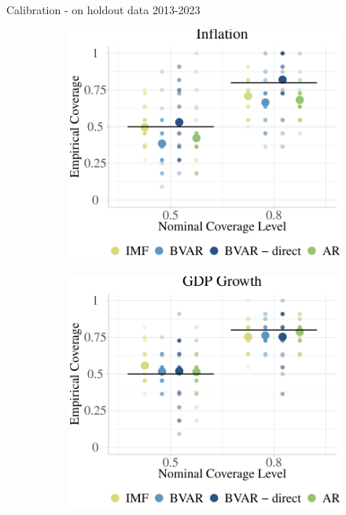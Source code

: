 \documentclass[en]{sdqbeamer}
\begin{document}
\begin{frame}{Calibration - on holdout data 2013-2023}
\begin{figure}
  \begin{subfigure}{0.385\textwidth}
  \centering
    \includegraphics[width=\textwidth]{figures/ho_coverage_pcpi_pch_absolute_rollingwindow.pdf} %
  \end{subfigure}
  \hspace*{12mm}
  \begin{subfigure}{0.385\textwidth}
  \centering
    \includegraphics[width=\textwidth]{figures/ho_coverage_ngdp_rpch_absolute_rollingwindow.pdf} %
  \end{subfigure}%
\end{figure}


\end{frame}
\end{document}
